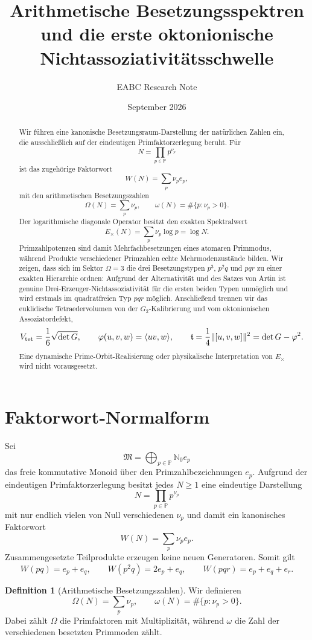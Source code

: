 \documentclass[11pt,a4paper]{article}
\title{\textbf{Arithmetische Besetzungsspektren und die erste oktonionische Nichtassoziativitätsschwelle}}
\author{EABC Research Note}
\date{September 2026}
\theoremstyle{definition}
\newtheorem{definition}[theorem]{Definition}
\theoremstyle{remark}
\newcommand{\PP}{\mathbb P}
\newcommand{\NN}{\mathbb N}
\begin{document}
\maketitle

\begin{abstract}
Wir führen eine kanonische Besetzungsraum-Darstellung der natürlichen Zahlen ein, die ausschließlich auf der eindeutigen Primfaktorzerlegung beruht. Für
\[
N=\prod_{p\in\PP}p^{\nu_p}
\]
ist das zugehörige Faktorwort
\[
W(N)=\sum_p\nu_p e_p,
\]
mit den arithmetischen Besetzungszahlen
\[
\Omega(N)=\sum_p\nu_p,
\qquad
\omega(N)=\#\{p:\nu_p>0\}.
\]
Der logarithmische diagonale Operator besitzt den exakten Spektralwert
\[
E_\times(N)=\sum_p\nu_p\log p=\log N.
\]
Primzahlpotenzen sind damit Mehrfachbesetzungen eines atomaren Primmodus, während Produkte verschiedener Primzahlen echte Mehrmodenzustände bilden. Wir zeigen, dass sich im Sektor $\Omega=3$ die drei Besetzungstypen $p^3$, $p^2q$ und $pqr$ zu einer exakten Hierarchie ordnen: Aufgrund der Alternativität und des Satzes von Artin ist genuine Drei-Erzeuger-Nichtassoziativität für die ersten beiden Typen unmöglich und wird erstmals im quadratfreien Typ $pqr$ möglich. Anschließend trennen wir das euklidische Tetraedervolumen von der $G_2$-Kalibrierung und vom oktonionischen Assoziatordefekt,
\[
V_{\rm tet}=\frac16\sqrt{\det G},\qquad
\varphi(u,v,w)=\langle uv,w\rangle,\qquad
\mathfrak t=\frac14\|[u,v,w]\|^2=\det G-\varphi^2.
\]
Eine dynamische Prime-Orbit-Realisierung oder physikalische Interpretation von $E_\times$ wird nicht vorausgesetzt.
\end{abstract}

\section{Faktorwort-Normalform}
Sei
\[
\mathfrak M=\bigoplus_{p\in\PP}\NN_0 e_p
\]
das freie kommutative Monoid über den Primzahlbezeichnungen $e_p$. Aufgrund der eindeutigen Primfaktorzerlegung besitzt jedes $N\ge1$ eine eindeutige Darstellung
\[
N=\prod_{p\in\PP}p^{\nu_p}
\]
mit nur endlich vielen von Null verschiedenen $\nu_p$ und damit ein kanonisches Faktorwort
\begin{equation}
W(N)=\sum_p\nu_p e_p.
\end{equation}
Zusammengesetzte Teilprodukte erzeugen keine neuen Generatoren. Somit gilt
\[
W(pq)=e_p+e_q,\qquad
W(p^2q)=2e_p+e_q,\qquad
W(pqr)=e_p+e_q+e_r.
\]

\begin{definition}[Arithmetische Besetzungszahlen]
Wir definieren
\[
\Omega(N)=\sum_p\nu_p,
\qquad
\omega(N)=\#\{p:\nu_p>0\}.
\]
Dabei zählt $\Omega$ die Primfaktoren mit Multiplizität, während $\omega$ die Zahl der verschiedenen besetzten Primmoden zählt.
\end{definition}
\end{document}
